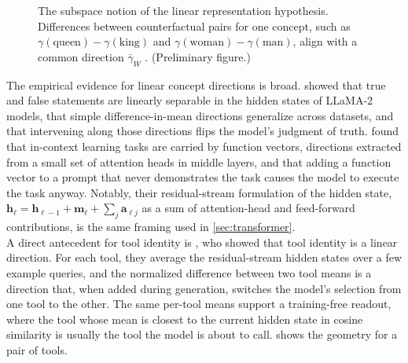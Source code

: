 \begin{figure}[htbp]
\centering
{}
\caption{The subspace notion of the linear representation hypothesis. Differences between counterfactual pairs for one concept, such as $\gamma(\text{queen}) - \gamma(\text{king})$ and $\gamma(\text{woman}) - \gamma(\text{man})$, align with a common direction $\bar{\gamma}_W$ \cite{park2024linear}. (Preliminary figure.)}
\label{fig:conceptdirection}
\end{figure}


The empirical evidence for linear concept directions is broad.
\textcite{marks2024geometry} showed that true and false statements are linearly separable in the hidden states of LLaMA-2 models, that simple difference-in-mean directions generalize across datasets, and that intervening along those directions flips the model's judgment of truth.
\textcite{todd2024function} found that in-context learning tasks are carried by function vectors, directions extracted from a small set of attention heads in middle layers, and that adding a function vector to a prompt that never demonstrates the task causes the model to execute the task anyway.
Notably, their residual-stream formulation of the hidden state, $\mathbf{h}_\ell = \mathbf{h}_{\ell-1} + \mathbf{m}_\ell + \sum_j \mathbf{a}_{\ell j}$ as a sum of attention-head and feed-forward contributions, is the same framing used in \cref{sec:transformer}.
\\

A direct antecedent for tool identity is \textcite{wu2026linearly}, who showed that tool identity is a linear direction.
For each tool, they average the residual-stream hidden states over a few example queries, and the normalized difference between two tool means is a direction that, when added during generation, switches the model's selection from one tool to the other.
The same per-tool means support a training-free readout, where the tool whose mean is closest to the current hidden state in cosine similarity is usually the tool the model is about to call.
 shows the geometry for a pair of tools.

